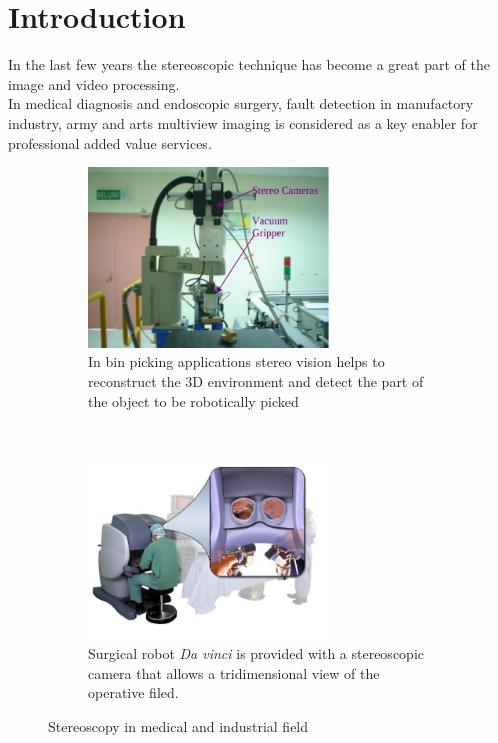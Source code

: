 \chapter*{Introduction}
\label{intro}
{}

In the last few years the stereoscopic technique has become a great part of the image and video processing.\\
In medical diagnosis and endoscopic surgery, fault detection in manufactory industry, army and arts
multiview imaging is considered as a key enabler  for professional added value services.\\
\begin{figure}[h!]
\centering
\begin{subfigure}[]{0.5\textwidth}
		\centering
        \includegraphics[width=0.7\textwidth]{./img/bin_pick.png}
                \caption{\scriptsize{In bin picking applications stereo vision helps to reconstruct the 3D environment and detect the part of the object to be robotically picked}}
\end{subfigure}%
~ \quad
\begin{subfigure}[]{0.5\textwidth}
	\centering
	\includegraphics[width=0.7\textwidth]{./img/da_vinci.jpg}
          \caption{\scriptsize{Surgical robot \textit{Da vinci} is provided with a stereoscopic camera that allows a tridimensional view of the operative filed.}}
\end{subfigure} 
\caption{\small{Stereoscopy in medical and industrial field}}
\end{figure}

